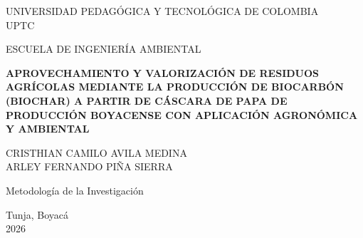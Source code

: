 \begin{titlepage}

\centering

{\large UNIVERSIDAD PEDAGÓGICA Y TECNOLÓGICA DE COLOMBIA\\
UPTC\\[1cm]}

{\large ESCUELA DE INGENIERÍA AMBIENTAL\\[2cm]}

{\Large \textbf{APROVECHAMIENTO Y VALORIZACIÓN DE RESIDUOS AGRÍCOLAS MEDIANTE LA PRODUCCIÓN DE BIOCARBÓN (BIOCHAR) A PARTIR DE CÁSCARA DE PAPA DE PRODUCCIÓN BOYACENSE CON APLICACIÓN AGRONÓMICA Y AMBIENTAL}\\[2cm]}

{\large CRISTHIAN CAMILO AVILA MEDINA\\
ARLEY FERNANDO PIÑA SIERRA\\[2cm]}

{\large Metodología de la Investigación\\[1cm]}

{\large Tunja, Boyacá\\
2026}

\end{titlepage}
